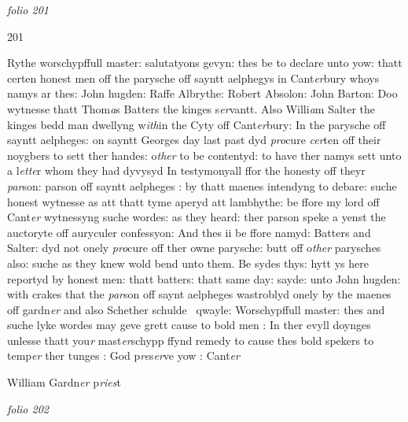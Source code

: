 \documentclass[12pt, a4paper]{book}
\begin{document}
\textit{folio 201}
      				
      				
      				
      				\begin{flushright}{\color{Mahogany}201}\end{flushright}
      				
      					
		\ifthenelse{\isodd{\thepage}}
		{\reversemarginpar}
		{\normalmarginpar}
		Rythe worschypffull master: salutatyons gevyn: thes be to declare unto yow: thatt certen honest men off the parysche off sayntt aelphegys in Cant\textit{er}bury whoys namys ar thes: John hugden: Raffe Albrythe: Robert Absolon: John Barton: Doo wytnesse thatt Thom\textit{a}s Batters the kinges s\textit{er}vantt. Also Willi\textit{a}m Salter the kinges bedd man dwellyng w\textit{ith}in the Cyty off Cant\textit{er}bury: In the parysche off sayntt aelpheges: on sayntt Georges day last past dyd \textit{pro}cure \textit{cer}ten off their noygbers to sett ther handes: o\textit{ther} to be contentyd: to have ther namys sett unto a l\textit{ette}r whom they had dyvysyd In testymonyall ffor the honesty off theyr \textit{par}son: parson off sayntt aelpheges : by thatt maenes intendyng to debare: suche honest wytnesse as att thatt tyme aperyd att lambhythe: be ffore my lord off Cant\textit{er} wytnessyng suche wordes: as they heard: ther parson speke a yenst the auctoryte off auryculer confessyon: And thes ii be ffore namyd: Batters and Salter: dyd not onely \textit{pro}cure off ther owne parysche: butt off o\textit{ther} parysches also: suche as they knew wold bend unto them. Be sydes thys: hytt ys here reportyd by honest men: thatt batters: thatt same day: sayde: unto John hugden: with crakes that the \textit{par}son off saynt aelpheges wastroblyd onely by the maenes off gardn\textit{er} and also Schether schulde  qwayle: Worschypffull master: thes and suche lyke wordes may geve grett cause to bold men : In ther evyll doynges unlesse thatt you\textit{r} mast\textit{er}schypp ffynd remedy to cause thes bold spekers to temp\textit{er} ther tunges : God p\textit{re}s\textit{er}ve yow : Cant\textit{er}
      				
		\ifthenelse{\isodd{\thepage}}
		{\reversemarginpar}
		{\normalmarginpar}
		William Gardn\textit{er} p\textit{ries}t
      				
\dotfill
						\newpage
{}

\textit{folio 202}


         \vspace*{4cm}
         
\end{document}
